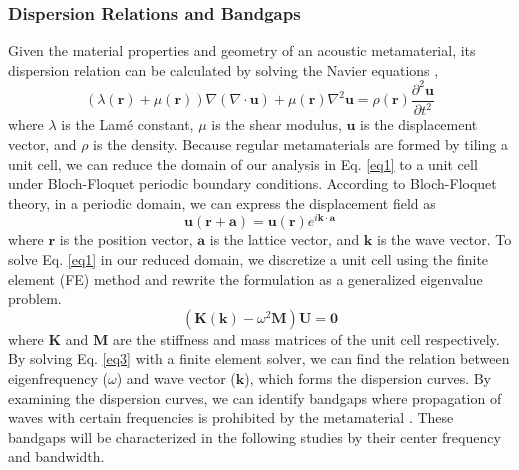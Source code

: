 \documentclass[preprint,review,12pt]{elsarticle}
\begin{document}
\subsubsection{Dispersion Relations and Bandgaps}
\label{subsubsection:Dispersion Relations and Bandgaps}
Given the material properties and geometry of an acoustic metamaterial, its dispersion relation can be calculated by solving the Navier equations \citep[see][]{zhang2021realization},  
\begin{equation}
    (\lambda (\mathbf{r})+ \mu (\mathbf{r})) \nabla(\nabla \cdot \mathbf{u}) + \mu (\mathbf{r}) \nabla^2 \mathbf{u} = \rho (\mathbf{r}) \frac{\partial^2 \mathbf{u}}{\partial t^2} \label{eq1}
\end{equation} 
where $\lambda$ is the Lamé constant, $\mu$ is the shear modulus, $\mathbf{u}$ is the displacement vector, and $\rho$ is the density. 
Because regular metamaterials are formed by tiling a unit cell, we can reduce the domain of our analysis in Eq. \eqref{eq1} to a unit cell under Bloch-Floquet periodic boundary conditions. According to Bloch-Floquet theory, in a periodic domain, we can express the displacement field as \citep{yang2016effective}
\begin{equation}
    \mathbf{u}(\mathbf{r}+\mathbf{a}) = \mathbf{u}(\mathbf{r})e^{i\mathbf{k} \cdot \mathbf{a}}  \label{eq2}
\end{equation}
where $\mathbf{r}$ is the position vector, $\mathbf{a}$ is the lattice vector, and $\mathbf{k}$ is the wave vector. To solve Eq. \eqref{eq1} in our reduced domain, we discretize a unit cell using the finite element (FE) method and rewrite the formulation as a generalized eigenvalue problem.
\begin{equation}
    (\mathbf{K}(\mathbf{k}) - \omega^2 \mathbf{M})\mathbf{U} = \mathbf{0}  \label{eq3}
\end{equation}
where $\mathbf{K}$ and $\mathbf{M}$ are the stiffness and mass matrices of the unit cell respectively. By solving Eq. \eqref{eq3} with a finite element solver, we can find the relation between eigenfrequency ($\omega$) and wave vector ($\mathbf{k}$), which forms the dispersion curves. By examining the dispersion curves, we can identify bandgaps where propagation of waves with certain frequencies is prohibited by the metamaterial \cite{bilal2011ultrawide}. These bandgaps will be characterized in the following studies by their center frequency and bandwidth.

\end{document}
